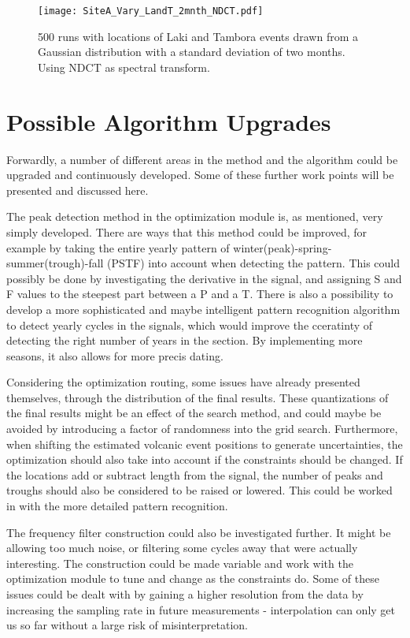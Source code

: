 \documentclass[../../CompleteThesis2/Complete_2ndDraft]{subfiles}
\begin{document}
\begin{figure}[!htb]
	\centering
	\texttt{[image: SiteA\_Vary\_LandT\_2mnth\_NDCT.pdf]}
	\caption[2 Month Variation of Event Locations, Site A]{\small 500 runs with locations of Laki and Tambora events drawn from a Gaussian distribution with a standard deviation of two months. Using NDCT as spectral transform.}
	\label{fig:SiteA_LandT_Gauss_2mnth_NDCT}
\end{figure}



\section[Upgrades][Upgrades]{Possible Algorithm Upgrades}
\label{Sec:Method_Upgrades}
Forwardly, a number of different areas in the method and the algorithm could be upgraded and continuously developed. Some of these further work points will be presented and discussed here.

The peak detection method in the optimization module is, as mentioned, very simply developed. There are ways that this method could be improved, for example by taking the entire yearly pattern of winter(peak)-spring-summer(trough)-fall (PSTF) into account when detecting the pattern. This could possibly be done by investigating the derivative in the signal, and assigning S and F values to the steepest part between a P and a T. There is also a possibility to develop a more sophisticated and maybe intelligent pattern recognition algorithm to detect yearly cycles in the signals, which would improve the cceratinty of detecting the right number of years in the section. By implementing more seasons, it also allows for more precis dating.

Considering the optimization routing, some issues have already presented themselves, through the distribution of the final results. These quantizations of the final results might be an effect of the search method, and could maybe be avoided by introducing a factor of randomness into the grid search. Furthermore, when shifting the estimated volcanic event positions to generate uncertainties, the optimization should also take into account if the constraints should be changed. If the locations add or subtract length from the signal, the number of peaks and troughs should also be considered to be raised or lowered. This could be worked in with the more detailed pattern recognition.

The frequency filter construction could also be investigated further. It might be allowing too much noise, or filtering some cycles away that were actually interesting. The construction could be made variable and work with the optimization module to tune and change as the constraints do. Some of these issues could be dealt with by gaining a higher resolution from the data by increasing the sampling rate in future measurements - interpolation can only get us so far without a large risk of misinterpretation. 
\end{document}
